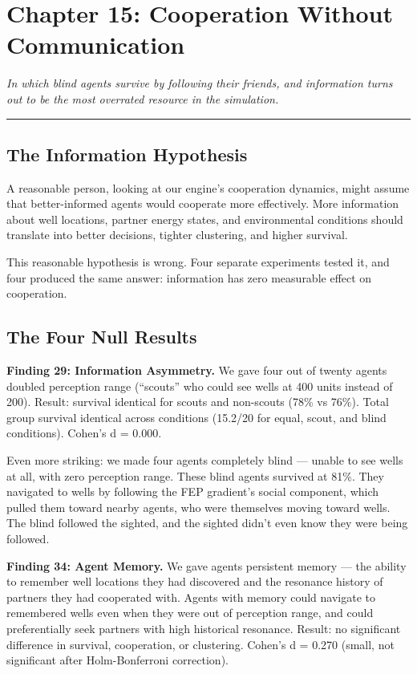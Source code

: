 \chapter{Chapter 15: Cooperation Without Communication}\label{chapter-15-cooperation-without-communication}

\emph{In which blind agents survive by following their friends, and information turns out to be the most overrated resource in the simulation.}

\begin{center}\rule{0.5\linewidth}{0.5pt}\end{center}

\section{The Information Hypothesis}\label{the-information-hypothesis}

A reasonable person, looking at our engine's cooperation dynamics, might assume that better-informed agents would cooperate more effectively. More information about well locations, partner energy states, and environmental conditions should translate into better decisions, tighter clustering, and higher survival.

This reasonable hypothesis is wrong. Four separate experiments tested it, and four produced the same answer: information has zero measurable effect on cooperation.

\section{The Four Null Results}\label{the-four-null-results}

\textbf{Finding 29: Information Asymmetry.} We gave four out of twenty agents doubled perception range (``scouts'' who could see wells at 400 units instead of 200). Result: survival identical for scouts and non-scouts (78\% vs 76\%). Total group survival identical across conditions (15.2/20 for equal, scout, and blind conditions). Cohen's d = 0.000.

Even more striking: we made four agents completely blind --- unable to see wells at all, with zero perception range. These blind agents survived at 81\%. They navigated to wells by following the FEP gradient's social component, which pulled them toward nearby agents, who were themselves moving toward wells. The blind followed the sighted, and the sighted didn't even know they were being followed.

\textbf{Finding 34: Agent Memory.} We gave agents persistent memory --- the ability to remember well locations they had discovered and the resonance history of partners they had cooperated with. Agents with memory could navigate to remembered wells even when they were out of perception range, and could preferentially seek partners with high historical resonance. Result: no significant difference in survival, cooperation, or clustering. Cohen's d = 0.270 (small, not significant after Holm-Bonferroni correction).

